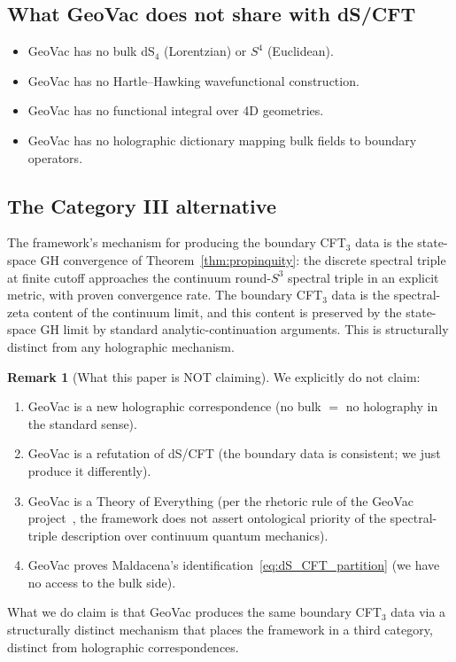 \documentclass[11pt,a4paper]{article}
\theoremstyle{plain}
\theoremstyle{definition}
\newtheorem{remark}[theorem]{Remark}
\newcommand{\sthree}{S^{3}}
\begin{document}
\subsection{What GeoVac does not share with dS/CFT}

\begin{itemize}
\item GeoVac has no bulk dS$_{4}$ (Lorentzian) or $S^{4}$ (Euclidean).
\item GeoVac has no Hartle--Hawking wavefunctional construction.
\item GeoVac has no functional integral over 4D geometries.
\item GeoVac has no holographic dictionary mapping bulk fields to
boundary operators.
\end{itemize}

\subsection{The Category III alternative}

The framework's mechanism for producing the boundary CFT$_{3}$ data
is the state-space GH convergence of Theorem~\ref{thm:propinquity}: the
discrete spectral triple at finite cutoff approaches the continuum
round-$\sthree$ spectral triple in an explicit metric, with proven
convergence rate. The boundary CFT$_{3}$ data is the spectral-zeta
content of the continuum limit, and this content is preserved by the
state-space GH limit by standard analytic-continuation arguments. This
is structurally distinct from any holographic mechanism.

\begin{remark}[What this paper is NOT claiming]
\label{rem:not_claiming}
We explicitly do not claim:
\begin{enumerate}
\item GeoVac is a new holographic correspondence (no bulk $=$ no
holography in the standard sense).
\item GeoVac is a refutation of dS/CFT (the boundary data is
consistent; we just produce it differently).
\item GeoVac is a Theory of Everything (per the rhetoric rule of
the GeoVac project~\cite{paper7}, the framework does not assert
ontological priority of the spectral-triple description over
continuum quantum mechanics).
\item GeoVac proves Maldacena's identification~\eqref{eq:dS_CFT_partition}
(we have no access to the bulk side).
\end{enumerate}
What we do claim is that GeoVac produces the same boundary CFT$_{3}$
data via a structurally distinct mechanism that places the framework
in a third category, distinct from holographic correspondences.
\end{remark}
\end{document}
